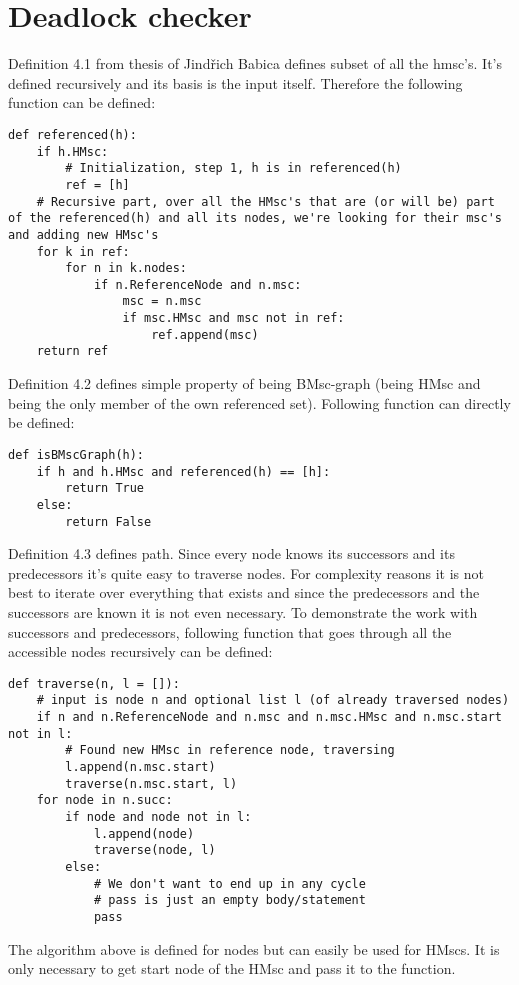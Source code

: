 \documentclass[11pt,oneside]{fithesis2}
\begin{document}
\section{Deadlock checker}
Definition 4.1 from thesis of Jindřich Babica defines subset of all the hmsc's. It's defined recursively and its basis is the input itself. Therefore the following function can be defined:
\begin{lstlisting}
def referenced(h):
    if h.HMsc:
        # Initialization, step 1, h is in referenced(h)
        ref = [h]
    # Recursive part, over all the HMsc's that are (or will be) part of the referenced(h) and all its nodes, we're looking for their msc's and adding new HMsc's
    for k in ref:
        for n in k.nodes:
            if n.ReferenceNode and n.msc:
                msc = n.msc
                if msc.HMsc and msc not in ref:
                    ref.append(msc)
    return ref
\end{lstlisting}
Definition 4.2 defines simple property of being BMsc-graph (being HMsc and being the only member of the own referenced set). Following function can directly be defined:
\begin{lstlisting}
def isBMscGraph(h):
    if h and h.HMsc and referenced(h) == [h]:
        return True
    else:
        return False
\end{lstlisting}
Definition 4.3 defines path. Since every node knows its successors and its predecessors it's quite easy to traverse nodes. For complexity reasons it is not best to iterate over everything that exists and since the predecessors and the successors are known it is not even necessary. To demonstrate the work with successors and predecessors, following function that goes through all the accessible nodes recursively can be defined:
\begin{lstlisting}
def traverse(n, l = []):
    # input is node n and optional list l (of already traversed nodes)
    if n and n.ReferenceNode and n.msc and n.msc.HMsc and n.msc.start not in l:
        # Found new HMsc in reference node, traversing
        l.append(n.msc.start)
        traverse(n.msc.start, l)
    for node in n.succ:
        if node and node not in l:
            l.append(node)
            traverse(node, l)
        else:
            # We don't want to end up in any cycle
            # pass is just an empty body/statement
            pass
\end{lstlisting}
The algorithm above is defined for nodes but can easily be used for HMscs. It is only necessary to get start node of the HMsc and pass it to the function.
\end{document}
